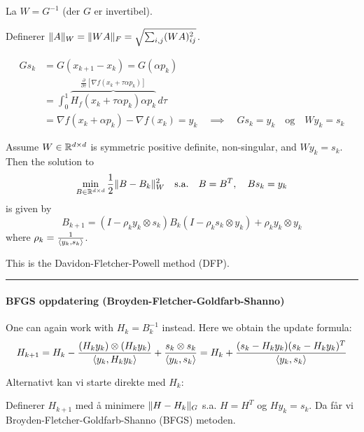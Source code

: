 La \( W = G^{-1} \) (der \( G \) er invertibel).

Definerer \( \lVert A\rVert_W = \lVert WA\rVert_F = \sqrt{\sum_{i,j} (W A)_{ij}^2} \).

\begin{remark}{}{}
  \begin{align*}
    Gs_k & = G(x_{k+1} - x_k) = G(\alpha p_k)                                                                                                                 \\
         & = \int_0^1 \overbrace{H_f(x_k + \tau \alpha p_k) \alpha p_k}^{\frac{\partial}{\partial \tau}\left[\nabla f(x_k + \tau \alpha p_k)\right]} \, d\tau \\
         & = \nabla f(x_k + \alpha p_k) - \nabla f(x_k) = y_k \quad \implies \quad Gs_k = y_k \quad \text{og} \quad W y_k = s_k
  \end{align*}
\end{remark}

\begin{theorem}{}{}
  Assume \(W\in \mathbb{R}^{d \times d}\) is symmetric positive definite, non-singular, and \(W y_k = s_k\). Then the solution to
  \[
    \min_{B \in \mathbb{R}^{d \times d}} \frac{1}{2} \lVert B - B_k\rVert_W^2 \quad \text{s.a.} \quad B = B^T, \quad B s_k = y_k
  \]
  is given by
  \[
    B_{k+1} = \left(I - \rho_k y_k \otimes s_k\right) B_k \left(I - \rho_k s_k \otimes y_k\right) + \rho_k y_k \otimes y_k
  \]
  where \( \rho_k = \frac{1}{\langle y_k, s_k\rangle} \).

  This is the Davidon-Fletcher-Powell method (DFP).
\end{theorem}

\hrule
\vspace{1em}

\paragraph{BFGS oppdatering (Broyden-Fletcher-Goldfarb-Shanno)}

One can again work with \(H_k = B_k^{-1}\) instead.
Here we obtain the update formula:
\[
  H_{k+1} = H_k - \frac{\left(H_k y_k\right) \otimes \left(H_k y_k\right)}{\langle y_k, H_k y_k\rangle} + \frac{s_k \otimes s_k}{\langle y_k, s_k\rangle}
  = H_k + \frac{(s_k - H_k y_k)(s_k - H_k y_k)^T}{\langle y_k, s_k\rangle}
\]

Alternativt kan vi starte direkte med \(H_k \):

Definerer \( H_{k+1} \) med å minimere \( \lVert H - H_k\rVert_G \) s.a. \( H = H^T \) og \( H y_k = s_k \).
Da får vi Broyden-Fletcher-Goldfarb-Shanno (BFGS) metoden.

